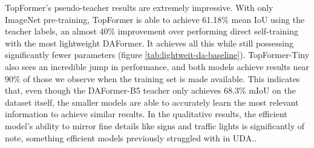 \documentclass[a4paper,12pt]{report}
\begin{document}
TopFormer's pseudo-teacher results are extremely impressive. With only ImageNet pre-training, TopFormer is able to achieve 61.18\% mean IoU using the teacher labels, an almost 40\% improvement over performing direct self-training with the most lightweight DAFormer. It achieves all this while still possessing significantly fewer parameters (figure \autoref{tab:lightweit-da-baseline}). TopFormer-Tiny also sees an incredible jump in performance, and both models achieve results near 90\% of those we observe when the training set is made available. This indicates that, even though the DAFormer-B5 teacher only achieves 68.3\% mIoU on the dataset itself, the smaller models are able to accurately learn the most relevant information to achieve similar results. In the qualitative results, the efficient model's ability to mirror fine details like signs and traffic lights is significantly of note, something efficient models previously struggled with in UDA..
\end{document}
